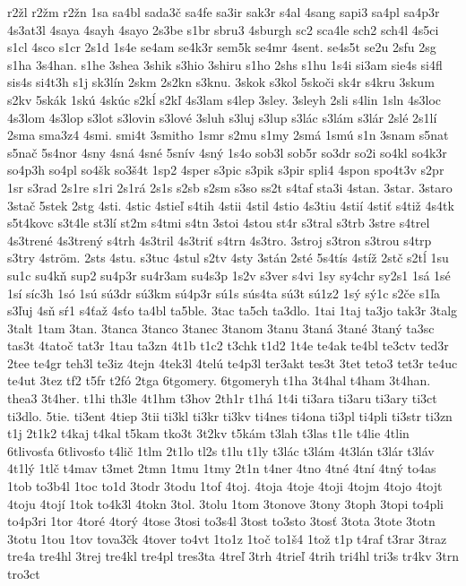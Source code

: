 {r2žl
r2žm
r2žn
1sa
sa4bl
sada3č
sa4fe
sa3ir
sak3r
s4al
4sang
sapi3
sa4pl
sa4p3r
4s3at3l
4saya
4sayh
4sayo
2s3be
s1br
sbru3
4sburgh
sc2
sca4le
sch2
sch4l
4s5ci
s1cl
4sco
s1cr
2s1d
1s4e
se4am
se4k3r
sem5k
se4mr
4sent.
se4s5t
se2u
2sfu
2sg
s1ha
3s4han.
s1he
3shea
3shik
s3hio
3shiru
s1ho
2shs
s1hu
1s4i
si3am
sie4s
si4fl
sis4s
si4t3h
s1j
sk3lín
2skm
2s2kn
s3knu.
3skok
s3kol
5skoči
sk4r
s4kru
3skum
s2kv
5skák
1skú
4skúc
s2kĺ
s2kľ
4s3lam
s4lep
3sley.
3sleyh
2sli
s4lin
1sln
4s3loc
4s3lom
4s3lop
s3lot
s3lovin
s3lové
3sluh
s3luj
s3lup
s3lác
s3lám
s3lár
2slé
2s1lí
2sma
sma3z4
4smi.
smi4t
3smitho
1smr
s2mu
s1my
2smá
1smú
s1n
3snam
s5nat
s5nač
5s4nor
4sny
4sná
4sné
5snív
4sný
1s4o
sob3l
sob5r
so3dr
so2i
so4kl
so4k3r
so4p3h
so4pl
so4šk
so3š4t
1sp2
4sper
s3pic
s3pik
s3pir
spli4
4spon
spo4t3v
s2pr
1sr
s3rad
2s1re
s1ri
2s1rá
2s1s
s2sb
s2sm
s3so
ss2t
s4taf
sta3i
4stan.
3star.
3staro
3stač
5stek
2stg
4sti.
4stic
4stieľ
s4tih
4stii
4stil
4stio
4s3tiu
4stií
4stiť
s4tiž
4s4tk
s5t4kovc
s3t4le
st3lí
st2m
s4tmi
s4tn
3stoi
4stou
st4r
s3tral
s3trb
3stre
s4trel
4s3trené
4s3trený
s4trh
4s3tril
4s3triť
s4trn
4s3tro.
3stroj
s3tron
s3trou
s4trp
s3try
4ström.
2sts
4stu.
s3tuc
4stul
s2tv
4sty
3stán
2sté
5s4tís
4stíž
2stč
s2tĺ
1su
su1c
su4kň
sup2
su4p3r
su4r3am
su4s3p
1s2v
s3ver
s4vi
1sy
sy4chr
sy2s1
1sá
1sé
1sí
síc3h
1só
1sú
sú3dr
sú3km
sú4p3r
sú1s
sús4ta
sú3t
sú1z2
1sý
sý1c
s2če
s1ľa
s3ľuj
4sň
sŕ1
s4ťaž
4sťo
ta4bl
ta5ble.
3tac
ta5ch
ta3dlo.
1tai
1taj
ta3jo
tak3r
3talg
3talt
1tam
3tan.
3tanca
3tanco
3tanec
3tanom
3tanu
3taná
3tané
3taný
ta3sc
tas3t
4tatoč
tat3r
1tau
ta3zn
4t1b
t1c2
t3chk
t1d2
1t4e
te4ak
te4bl
te3ctv
ted3r
2tee
te4gr
teh3l
te3iz
4tejn
4tek3l
4telú
te4p3l
ter3akt
tes3t
3tet
teto3
tet3r
te4uc
te4ut
3tez
tf2
t5fr
t2fó
2tga
6tgomery.
6tgomeryh
t1ha
3t4hal
t4ham
3t4han.
thea3
3t4her.
t1hi
th3le
4t1hm
t3hov
2th1r
t1há
1t4i
ti3ara
ti3aru
ti3ary
ti3ct
ti3dlo.
5tie.
ti3ent
4tiep
3tii
ti3kl
ti3kr
ti3kv
ti4nes
ti4ona
ti3pl
ti4pli
ti3str
ti3zn
t1j
2t1k2
t4kaj
t4kal
t5kam
tko3t
3t2kv
t5kám
t3lah
t3las
t1le
t4lie
4tlin
6tlivosťa
6tlivosťo
t4lič
1tlm
2t1lo
tl2s
t1lu
t1ly
t3lác
t3lám
4t3lán
t3lár
t3láv
4t1lý
1tlč
t4mav
t3met
2tmn
1tmu
1tmy
2t1n
t4ner
4tno
4tné
4tní
4tný
to4as
1tob
to3b4l
1toc
to1d
3todr
3todu
1tof
4toj.
4toja
4toje
4toji
4tojm
4tojo
4tojt
4toju
4tojí
1tok
to4k3l
4tokn
3tol.
3tolu
1tom
3tonove
3tony
3toph
3topi
to4pli
to4p3ri
1tor
4toré
4torý
4tose
3tosi
to3s4l
3tost
to3sto
3tosť
3tota
3tote
3totn
3totu
1tou
1tov
tova3čk
4tover
to4vt
1to1z
1toč
to1š4
1tož
t1p
t4raf
t3rar
3traz
tre4a
tre4hl
3trej
tre4kl
tre4pl
tres3ta
4treľ
3trh
4trieľ
4trih
tri4hl
tri3s
tr4kv
3trn
tro3ct
}
